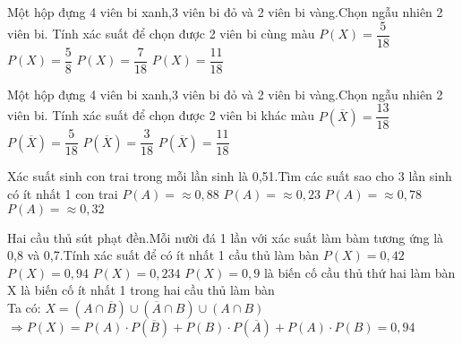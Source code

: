 \begin{ex}
Một hộp đựng 4 viên bi xanh,3 viên bi đỏ và 2 viên bi vàng.Chọn ngẫu nhiên 2 viên bi. Tính xác suất để chọn được 2 viên bi cùng màu
\choice
{\True $P(X)=\dfrac{5}{18}$}
{$P(X)=\dfrac{5}{8}$}
{$P(X)=\dfrac{7}{18}$}
{$P(X)=\dfrac{11}{18}$}
\end{ex}
\begin{ex}
Một hộp đựng 4 viên bi xanh,3 viên bi đỏ và 2 viên bi vàng.Chọn ngẫu nhiên 2 viên bi. Tính xác suất để chọn được 2 viên bi khác màu
\choice
{\True $P(\overline{X})=\dfrac{13}{18}$}
{$P(\overline{X})=\dfrac{5}{18}$}
{$P(\overline{X})=\dfrac{3}{18}$}
{$P(\overline{X})=\dfrac{11}{18}$}
\end{ex}
\begin{ex}
Xác suất sinh con trai trong mỗi lần sinh là 0{,}51.Tìm các suất sao cho 3 lần sinh có ít nhất 1 con trai
\choice
{\True $P(A)=\approx 0{,}88$}
{$P(A)=\approx 0{,}23$}
{$P(A)=\approx 0{,}78$}
{$P(A)=\approx 0{,}32$}
\end{ex}
\begin{ex}
Hai cầu thủ sút phạt đền.Mỗi nười đá 1 lần với xác suất làm bàm tương ứng là 0{,}8 và 0{,}7.Tính xác suất để có ít nhất 1 cầu thủ làm bàn
\choice
{$P(X)=0{,}42$}
{\True $P(X)=0{,}94$}
{$P(X)=0{,}234$}
{$P(X)=0{,}9$}
{là biến cố cầu thủ thứ hai làm bàn\\
X là biến cố ít nhất 1 trong hai cầu thủ làm bàn\\
Ta có: $X=(A\cap \overline{B})\cup \left(\overline{A}\cap B\right)\cup \left(A\cap B\right)$\\
$\Rightarrow P(X)=P(A)\cdot P(\overline{B})+P(B)\cdot P(\overline{A})+P(A)\cdot P(B)=0{,}94$}
\end{ex}
